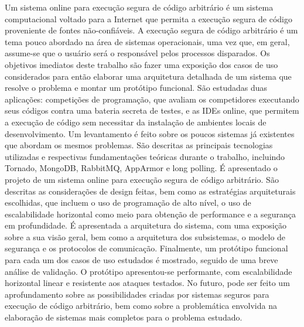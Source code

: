 \documentclass[ruledheader, 12pt]{abnt}
\begin{document}
\begin{resumo}
Um sistema online para execução segura de código arbitrário é um sistema computacional voltado para a Internet que permita a execução segura de código proveniente de fontes não-confiáveis. A execução segura de código arbitrário é um tema pouco abordado na área de sistemas operacionais, uma vez que, em geral, assume-se que o usuário será o responsável pelos processos disparados. Os objetivos imediatos deste trabalho são fazer uma exposição dos casos de uso considerados para então elaborar uma arquitetura detalhada de um sistema que resolve o problema e montar um protótipo funcional. São estudadas duas aplicações: competições de programação, que avaliam os competidores executando seus códigos contra uma bateria secreta de testes, e as IDEs online, que permitem a execução de código sem necessitar da instalação de ambientes locais de desenvolvimento. Um levantamento é feito sobre os poucos sistemas já existentes que abordam os mesmos problemas. São descritas as principais tecnologias utilizadas e respectivas fundamentações teóricas durante o trabalho, incluindo Tornado, MongoDB, RabbitMQ, AppArmor e long polling. É apresentado o projeto de um sistema online para execução segura de código arbitrário. São descritas as considerações de design feitas, bem como as estratégias arquiteturais escolhidas, que incluem o uso de programação de alto nível, o uso de escalabilidade horizontal como meio para obtenção de performance e a segurança em profundidade. É apresentada a arquitetura do sistema, com uma exposição sobre a sua visão geral, bem como a arquitetura dos subsistemas, o modelo de segurança e os protocolos de comunicação. Finalmente, um protótipo funcional para cada um dos casos de uso estudados é mostrado, seguido de uma breve análise de validação. O protótipo apresentou-se performante, com escalabilidade horizontal linear e resistente aos ataques testados. No futuro, pode ser feito um aprofundamento sobre as possibilidades criadas por sistemas seguros para execução de código arbitrário, bem como sobre a problemática envolvida na elaboração de sistemas mais completos para o problema estudado.
\end{resumo}
\end{document}
